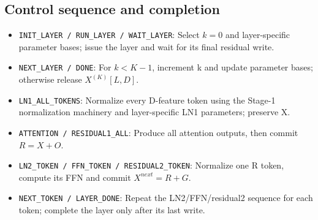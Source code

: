 \documentclass[11pt,a4paper]{article}
\begin{document}
\begin{center}
\end{center}

\subsection{Control sequence and completion}
\begin{itemize}
\item \texttt{INIT\_LAYER / RUN\_LAYER / WAIT\_LAYER}: Select $k=0$ and layer-specific parameter bases; issue the layer and wait for its final residual write.
\item \texttt{NEXT\_LAYER / DONE}: For $k<K-1$, increment k and update parameter bases; otherwise release $X^{(K)}[L,D]$.
\item \texttt{LN1\_ALL\_TOKENS}: Normalize every D-feature token using the Stage-1 normalization machinery and layer-specific LN1 parameters; preserve X.
\item \texttt{ATTENTION / RESIDUAL1\_ALL}: Produce all attention outputs, then commit $R=X+O$.
\item \texttt{LN2\_TOKEN / FFN\_TOKEN / RESIDUAL2\_TOKEN}: Normalize one R token, compute its FFN and commit $X^{next}=R+G$.
\item \texttt{NEXT\_TOKEN / LAYER\_DONE}: Repeat the LN2/FFN/residual2 sequence for each token; complete the layer only after its last write.
\end{itemize}
\end{document}
